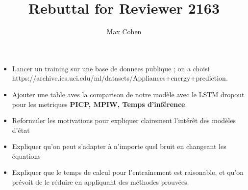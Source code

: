 \documentclass{article}
\title{Rebuttal for Reviewer 2163}
\author{Max Cohen}
\affil{Samovar, T\'el\'ecom SudParis, CITI, TIPIC, Institut Polyechnique de Paris}
\date{}
\begin{document}
\maketitle

\begin{itemize}
	\item Lancer un training sur une base de donnees publique ; on a choisi https://archive.ics.uci.edu/ml/datasets/Appliances+energy+prediction.
	\item Ajouter une table aves la comparison de notre modèle avec le LSTM dropout pour les metriques \textbf{PICP, MPIW, Temps d'inférence}.
	\item Reformuler les motivations pour expliquer clairement l'intérêt des modèles d'état
	\item Expliquer qu'on peut s'adapter à n'importe quel bruit en changeant les équations
	\item Expliquer que le temps de calcul pour l'entraînement est raisonable, et qu'on prévoit de le réduire en appliquant des méthodes prouvées.
\end{itemize}



\end{document}
